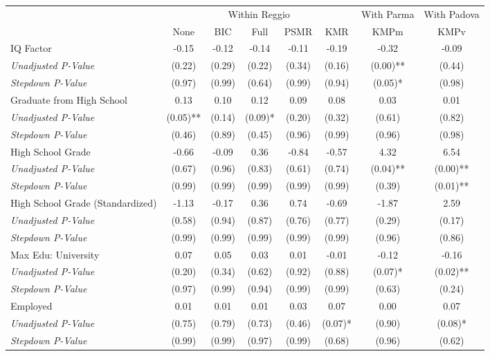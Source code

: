 \begin{tabular}{l c c c c c c c}
\toprule
& \multicolumn{5}{c}{Within Reggio} & With Parma & With Padova \\\cmidrule(lr){2-6} \cmidrule(lr){7-7} \cmidrule(lr){8-8}
 & None & BIC & Full & PSMR & KMR & KMPm & KMPv \\
\midrule
IQ Factor & -0.15 & -0.12 & -0.14 & -0.11 & -0.19 & -0.32 & -0.09 \\
\quad \textit{Unadjusted P-Value} & (0.22) & (0.29) & (0.22) & (0.34) & (0.16) & (0.00)** & (0.44) \\
\quad \textit{Stepdown P-Value} & (0.97) & (0.99) & (0.64) & (0.99) & (0.94) & (0.05)* & (0.98) \\
Graduate from High School & 0.13 & 0.10 & 0.12 & 0.09 & 0.08 & 0.03 & 0.01 \\
\quad \textit{Unadjusted P-Value} & (0.05)** & (0.14) & (0.09)* & (0.20) & (0.32) & (0.61) & (0.82) \\
\quad \textit{Stepdown P-Value} & (0.46) & (0.89) & (0.45) & (0.96) & (0.99) & (0.96) & (0.98) \\
High School Grade & -0.66 & -0.09 & 0.36 & -0.84 & -0.57 & 4.32 & 6.54 \\
\quad \textit{Unadjusted P-Value} & (0.67) & (0.96) & (0.83) & (0.61) & (0.74) & (0.04)** & (0.00)** \\
\quad \textit{Stepdown P-Value} & (0.99) & (0.99) & (0.99) & (0.99) & (0.99) & (0.39) & (0.01)** \\
High School Grade (Standardized) & -1.13 & -0.17 & 0.36 & 0.74 & -0.69 & -1.87 & 2.59 \\
\quad \textit{Unadjusted P-Value} & (0.58) & (0.94) & (0.87) & (0.76) & (0.77) & (0.29) & (0.17) \\
\quad \textit{Stepdown P-Value} & (0.99) & (0.99) & (0.99) & (0.99) & (0.99) & (0.96) & (0.86) \\
Max Edu: University & 0.07 & 0.05 & 0.03 & 0.01 & -0.01 & -0.12 & -0.16 \\
\quad \textit{Unadjusted P-Value} & (0.20) & (0.34) & (0.62) & (0.92) & (0.88) & (0.07)* & (0.02)** \\
\quad \textit{Stepdown P-Value} & (0.97) & (0.99) & (0.94) & (0.99) & (0.99) & (0.63) & (0.24) \\
Employed & 0.01 & 0.01 & 0.01 & 0.03 & 0.07 & 0.00 & 0.07 \\
\quad \textit{Unadjusted P-Value} & (0.75) & (0.79) & (0.73) & (0.46) & (0.07)* & (0.90) & (0.08)* \\
\quad \textit{Stepdown P-Value} & (0.99) & (0.99) & (0.97) & (0.99) & (0.68) & (0.96) & (0.62) \\

\end{tabular}
